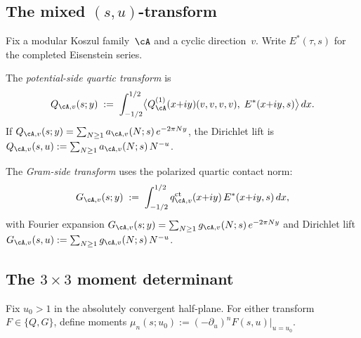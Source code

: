 \subsection{The mixed $(s,u)$-transform}%
\label{sec:mixed-su-transform}

Fix a modular Koszul family~$\cA$ and a cyclic direction~$v$.
Write $E^*(\tau,s)$ for the completed Eisenstein series.

\begin{definition}%
\label{def:potential-side-transform}%
%
The \emph{potential-side quartic transform} is
\begin{equation}\label{eq:potential-side}
Q_{\cA,v}(s;y)
\;:=\;
\int_{-1/2}^{1/2}
\bigl\langle
Q_\cA^{(1)}(x{+}iy)(v,v,v,v),\;
E^*(x{+}iy,s)
\bigr\rangle\,dx.
\end{equation}
If $Q_{\cA,v}(s;y) = \sum_{N \geq 1}a_{\cA,v}(N;s)\,
e^{-2\pi Ny}$, the Dirichlet lift is
$Q_{\cA,v}(s,u) := \sum_{N \geq 1}a_{\cA,v}(N;s)\,N^{-u}$.
\end{definition}

\begin{definition}%
\label{def:gram-side-transform}%
%
The \emph{Gram-side transform} uses the polarized quartic
contact norm:
\begin{equation}\label{eq:gram-side}
G_{\cA,v}(s;y)
\;:=\;
\int_{-1/2}^{1/2}
q_{\cA,v}^{\mathrm{ct}}(x{+}iy)\,
E^*(x{+}iy,s)\,dx,
\end{equation}
with Fourier expansion
$G_{\cA,v}(s;y)
= \sum_{N \geq 1}g_{\cA,v}(N;s)\,e^{-2\pi Ny}$
and Dirichlet lift
$G_{\cA,v}(s,u)
:= \sum_{N \geq 1}g_{\cA,v}(N;s)\,N^{-u}$.
\end{definition}

\subsection{The $3 \times 3$ moment determinant}%
\label{sec:3x3-determinant}

Fix $u_0 > 1$ in the absolutely convergent half-plane.
For either transform $F \in \{Q, G\}$, define moments
$\mu_n(s;u_0) := (-\partial_u)^n F(s,u)|_{u=u_0}$.

